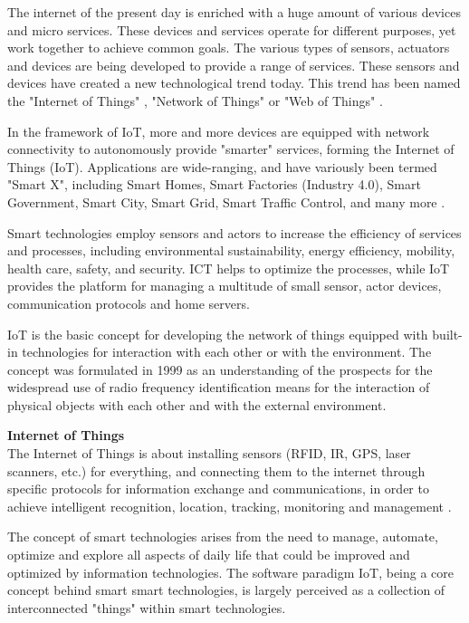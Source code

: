 The internet of the present day is enriched with a huge amount of various devices and micro services. These devices and services operate for different purposes, yet work together to achieve common goals. The various types of sensors, actuators and devices are being developed to provide a range of services. These sensors and devices have created a new technological trend today. This trend has been named the "Internet of Things" \cite{WeberRomana2010}, "Network of Things" \cite{Gubbi+2013} or "Web of Things" \cite{Guinard+2010}. 

In the framework of IoT, more and more devices are equipped with network connectivity to autonomously provide "smarter" services, forming the Internet of Things (IoT). Applications are wide-ranging, and have variously been termed "Smart X", including Smart Homes, Smart Factories (Industry 4.0), Smart Government, Smart City, Smart Grid, Smart Traffic Control, and many more \cite{Kuryazov+2018+1}.

Smart technologies employ sensors and actors to increase the efficiency of services and processes, including environmental sustainability, energy efficiency, mobility, health care, safety, and security. ICT helps to optimize the processes, while IoT provides the platform for managing a multitude of small sensor, actor devices, communication protocols and home servers.

IoT \cite{WeberRomana2010} is the basic concept for developing the network of things equipped with built-in technologies for interaction with each other or with the environment. The concept was formulated in 1999 as an understanding of the prospects for the widespread use of radio frequency identification means for the interaction of physical objects with each other and with the external environment. 
\begin{definition}
\textbf{Internet of Things}\label{definition:internetOfThings}\\
The Internet of Things is about installing sensors (RFID, IR, GPS, laser scanners, etc.) for everything, and connecting them to the internet through specific protocols for information exchange and communications, in order to achieve intelligent recognition, location, tracking, monitoring and management \cite{Atzori+2010}.
\end{definition}

The concept of smart technologies arises from the need to manage, automate, optimize and explore all aspects of daily life that could be improved and optimized by information technologies. The software paradigm IoT, being a core concept behind smart smart technologies, is largely perceived as a collection of interconnected "things" within smart technologies.

